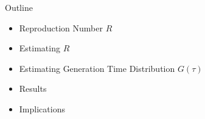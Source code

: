 \documentclass[aspectratio=169,professionalfonts]{beamer}
\begin{document}
\begin{frame}
  \maketitle
\end{frame}
\begin{frame}{Outline}
  \begin{itemize}
    \item Reproduction Number $R$
    \item Estimating $R$
    \item Estimating Generation Time Distribution $G(\tau)$
    \item Results
    \item Implications
  \end{itemize}
\end{frame}
\end{document}
